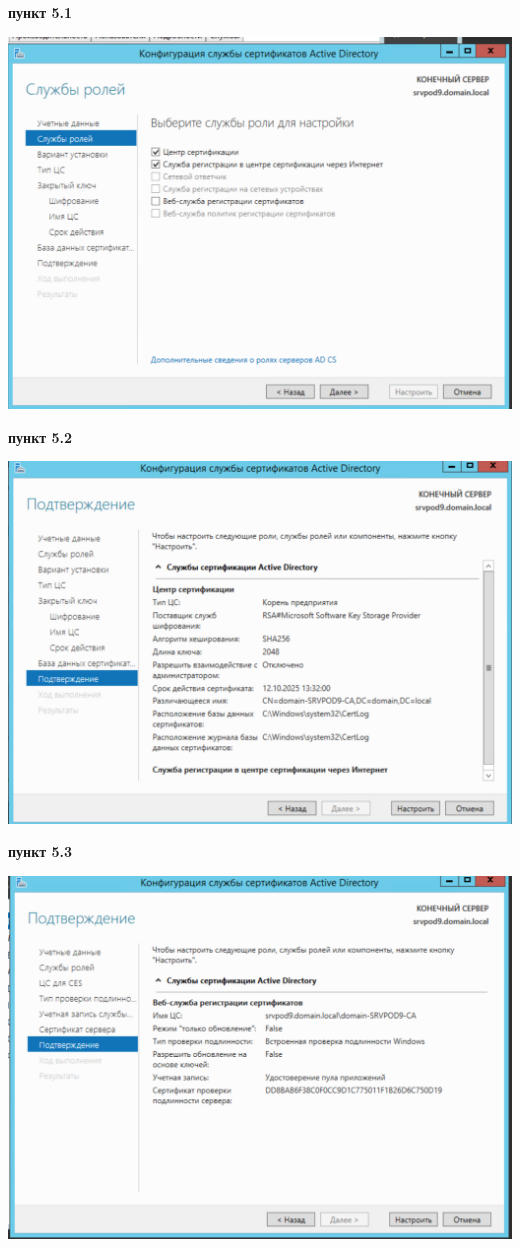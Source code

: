 \documentclass[a4paper,14pt]{extarticle}
\begin{document}
    \textbf{пункт 5.1}
    \begin{center}
        \includegraphics[scale=0.6]{5.1.png}
    \end{center}
    \newpage
    \textbf{пункт 5.2}
    \begin{center}
        \includegraphics[scale=0.6]{5.2.png}
    \end{center}
    \textbf{пункт 5.3}
    \begin{center}
        \includegraphics[scale=0.6]{5.3.png}
    \end{center}
\end{document}
